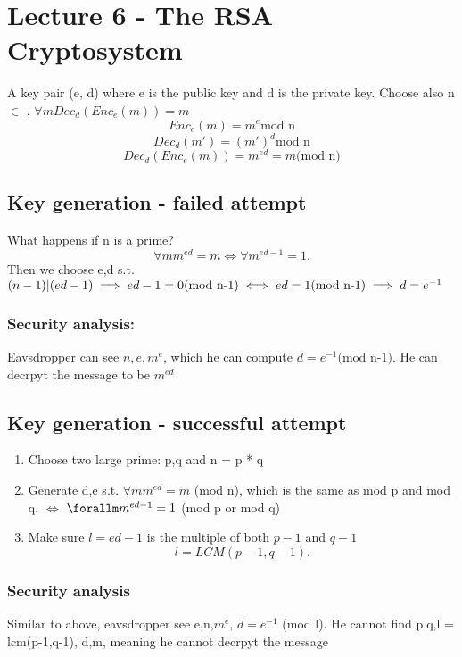\documentclass[../main.tex]{subfile}
\begin{document}
\section{Lecture 6 - The RSA Cryptosystem}
A key pair (e, d) where e is the public key and d is the private key. Choose also n $\in$ \N. $\forall  m Dec_{d}(Enc_{e}(m)) = m$
\begin{equation}
	Enc_{e}(m) = m^{e} \text{mod n}
\end{equation}
\begin{equation}
	Dec_{d}(m') = (m')^{d} \text{mod n}
\end{equation}
\begin{equation}
	Dec_{d}(Enc_{e}(m)) = m^{ed} = m \text{(mod n)}
\end{equation}
\subsection{Key generation - failed attempt}
What happens if n is a prime?
\[
	\forall m  m^{ed} = m \iff \forall m^{ed-1} = 1
.\] 
Then we choose e,d s.t. $(n-1)| (ed-1) \\\implies ed-1 = 0 \text{(mod n-1)}\iff ed = 1 \text{(mod n-1)} \\ \implies d = e^{-1}$ 
\subsubsection{Security analysis:}
Eavsdropper can see $n, e, m^{e}$, which he can compute $d = e^{-1} \text{(mod n-1)}$. He can decrpyt the message to be $m^{ed}$

\subsection{Key generation - successful attempt}
\begin{enumerate}
	\item Choose two large prime: p,q and n = p * q
	\item Generate d,e s.t. $\forall m m^{ed} = m$ (mod n), which is the same as mod p and mod q. $\iff$ $\forallm m^{ed-1} = 1$ (mod p or mod q)
	\item Make sure $l =  ed - 1$ is the multiple of both $p - 1$ and $q - 1$ \[
	l = LCM(p-1, q-1)
	.\] 
\end{enumerate}
\subsubsection{Security analysis}
Similar to above, eavsdropper see e,n,$m^{e}$, $d = e^{-1}$ (mod l). He cannot find p,q,l = lcm(p-1,q-1), d,m, meaning he cannot decrpyt the message
\end{document}
